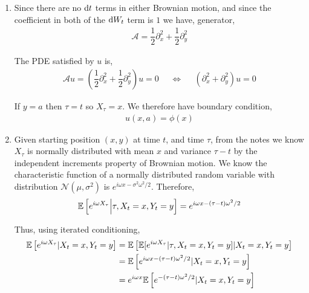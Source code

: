 \documentclass[10pt]{article}
\begin{document}
\begin{solution}[Solution]
\begin{enumerate}
    \item 
        Since there are no \( \mathrm{d} t \) terms in either Brownian motion, and since the coefficient in both of the \( \mathrm{d} W_t \) term is \( 1 \) we have, generator,
        \begin{align*}
            \mathcal{A} = \dfrac{1}{2}\partial_x^2 + \dfrac{1}{2}\partial_y^2
        \end{align*}
        
        The PDE satisfied by \( u \) is,
        \begin{align*}
            \mathcal{A} u = \left(\dfrac{1}{2} \partial_x^2 + \dfrac{1}{2}\partial_y^2\right) u = 0 && 
            \Longleftrightarrow
            && \left(\partial_{x}^2 + \partial_{y}^2\right) u = 0
        \end{align*}

        If \( y=a \) then \( \tau = t \) so \( X_\tau = x \). We therefore have boundary condition,
        \begin{align*}
            u(x,a) = \phi(x)
        \end{align*}
        

    \item 
        Given starting position \( (x,y) \) at time \( t \), and time \( \tau \), from the notes we know \( X_\tau \) is normally distributed with mean \( x \) and variance \( \tau - t \) by the independent increments property of Brownian motion. We know the characteristic function of a normally distributed random variable with distribution \( \mathcal{N}(\mu,\sigma^2) \) is \( e^{i\omega x - \sigma^2 \omega^2/2} \). Therefore, 
        \begin{align*}
            \mathbb{E} \left[ e^{i\omega X_\tau} \Big| \tau,X_t = x, Y_t = y \right] = e^{i\omega x - (\tau - t) \omega^2 /2}
        \end{align*}
        
        Thus, using iterated conditioning,
        \begin{align*}
            \mathbb{E} \left[ e^{i\omega X_\tau} | X_t = x, Y_t = y \right]
            &= \mathbb{E} \left[ \mathbb{E}[ e^{i\omega X_\tau} | \tau, X_t = x, Y_t = y] | X_t = x, Y_t = y \right] 
            \\&= \mathbb{E} \left[ e^{i\omega x - (\tau-t)\omega^2/2} | X_t = x, Y_t = y \right]
            \\&= e^{i\omega x}\mathbb{E} \left[ e^{- (\tau-t)\omega^2/2} | X_t = x, Y_t = y \right]
        \end{align*}
        

\end{enumerate}
\end{solution}
\end{document}
